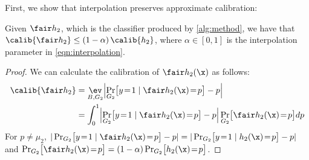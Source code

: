 First, we show that interpolation preserves approximate calibration:
\begin{thm}
  Given $\fair h_2$, which is the classifier produced by \autoref{alg:method},
  we have that $\calib{\fair h_2} \leq \left( 1 - \alpha \right) \calib{h_2}$, where
  $\alpha \in [0, 1]$ is the interpolation parameter in \eqref{eqn:interpolation}.
  \label{thm:calibration}
\end{thm}
%
\begin{proof}
  We can calculate the calibration of $\fair h_2(\x)$ as follows:
  \begin{align*}
    \calib{\fair h_2}
    &= \mathop{\ev}_{B, G_2} \Bigl\lvert \Pr_{G_2} \bigl[ y\!=\!1 \mid \fair
    h_2(\x)\!=\!p \bigr] - p \Bigr\rvert
    \\
    &= \int_{0}^1 \Bigl\lvert \Pr_{G_2} \bigl[ y\!=\!1 \mid \fair
    h_2(\x) \!=\!p \bigr] - p \Bigr\rvert
    \Pr_{G_2} \bigl[ \fair h_2(\x)\!=\!p\bigr] dp
  \end{align*}
  For $p \ne \mu_2$, $|\Pr_{G_2} \bigl[ y\!=\!1 \mid \fair h_2(\x) \!=\!p \bigr]
  - p| = |\Pr_{G_2} \bigl[ y\!=\!1 \mid h_2(\x) \!=\!p \bigr] - p|$ and
  $\Pr_{G_2} \bigl[ \fair h_2(\x)\!=\!p\bigr] = (1-\alpha)\Pr_{G_2} \bigl[
  h_2(\x)\!=\!p\bigr]$.


\end{proof}

